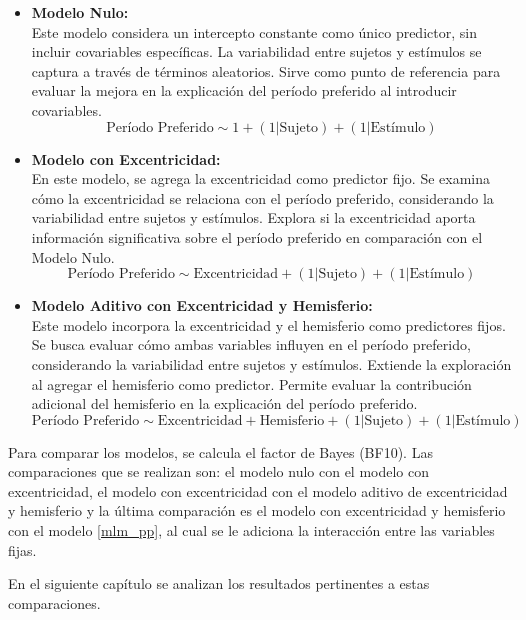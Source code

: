 \begin{itemize}
	\item \textbf{Modelo Nulo:}	\\
	Este modelo considera un intercepto constante como único predictor, sin incluir covariables específicas. La variabilidad entre sujetos y estímulos se captura a través de términos aleatorios. Sirve como punto de referencia para evaluar la mejora en la explicación del período preferido al introducir covariables.
	\begin{equation}
		\text{Período Preferido} \sim 1 + (1 | \text{Sujeto}) + (1 | \text{Estímulo})	
		\label{m_1}
	\end{equation}

	\item\textbf{Modelo con Excentricidad:}\\
	En este modelo, se agrega la excentricidad como predictor fijo. Se examina cómo la excentricidad se relaciona con el período preferido, considerando la variabilidad entre sujetos y estímulos. Explora si la excentricidad aporta información significativa sobre el período preferido en comparación con el Modelo Nulo.
	\begin{equation}
		\text{Período Preferido} \sim \text{Excentricidad} + (1 | \text{Sujeto}) + (1 | \text{Estímulo})	
		\label{m_2}
	\end{equation}

	\item \textbf{Modelo Aditivo con Excentricidad y Hemisferio:}\\
	Este modelo incorpora la excentricidad y el hemisferio como predictores fijos. Se busca evaluar cómo ambas variables influyen en el período preferido, considerando la variabilidad entre sujetos y estímulos. Extiende la exploración al agregar el hemisferio como predictor. Permite evaluar la contribución adicional del hemisferio en la explicación del período preferido.
	\begin{equation}
		\text{Período Preferido} \sim \text{Excentricidad} + \text{Hemisferio} + (1 | \text{Sujeto}) + (1 | \text{Estímulo})	
		\label{m_3}
	\end{equation}
	
\end{itemize}

Para comparar los modelos, se calcula el factor de Bayes (BF10). Las comparaciones que se realizan son: el modelo nulo con el modelo con excentricidad, el modelo con excentricidad con el modelo aditivo de excentricidad y hemisferio y la \'ultima comparaci\'on es el modelo con excentricidad y hemisferio con el modelo \ref{mlm_pp}, al cual se le adiciona la interacci\'on entre las variables fijas.

En el siguiente cap\'itulo se analizan los resultados pertinentes a estas comparaciones.









